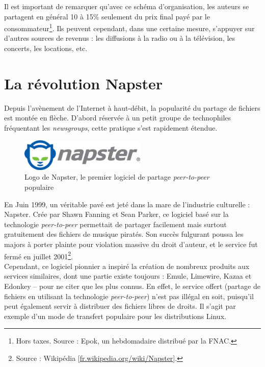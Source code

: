 \documentclass[a4paper]{report}
\begin{document}
	Il est important de remarquer qu'avec ce schéma d'organisation, les auteurs se partagent en général 10 à 15\% seulement du prix final payé par le consommateur\footnote{Hors taxes. Source : Epok, un hebdomadaire distribué par la FNAC.}. Ils peuvent cependant, dans une certaine mesure, s'appuyer sur d'autres sources de revenus : les diffusions à la radio ou à la télévision, les concerts, les locations, etc.

	\section{La révolution Napster}
	Depuis l'avènement de l'Internet à haut-débit, la popularité du partage de fichiers est montée en flèche. D'abord réservée à un petit groupe de technophiles fréquentant les \emph{newsgroups}, cette pratique s'est rapidement étendue.

	\begin{figure}[ht]
		\begin{center}
			\includegraphics[width=6cm]{images/logos/napster.jpg}
			\caption{Logo de Napster, le premier logiciel de partage \emph{peer-to-peer} populaire}
		\end{center}
	\end{figure}

	En Juin 1999, un véritable pavé est jeté dans la mare de l'industrie culturelle : Napster. Crée par Shawn Fanning et Sean Parker, ce logiciel basé sur la technologie \emph{peer-to-peer} permettait de partager facilement mais surtout gratuitement des fichiers de musique piratés. Son succès fulgurant poussa les majors à porter plainte pour violation massive du droit d'auteur, et le service fut fermé en juillet 2001\footnote{Source : Wikipédia [\href{http://fr.wikipedia.org/wiki/Napster}{fr.wikipedia.org/wiki/Napster}].}.\\

	Cependant, ce logiciel pionnier a inspiré la création de nombreux produits aux services similaires, dont une partie existe toujours : Emule, Limewire, Kazaa et Edonkey – pour ne citer que les plus connus. En effet, le service offert (partage de fichiers en utilisant la technologie \emph{peer-to-peer}) n'est pas illégal en soit, puisqu'il peut également servir à distribuer des fichiers libres de droits. Il s'agit par exemple d'un mode de transfert populaire pour les distributions Linux.
\end{document}
